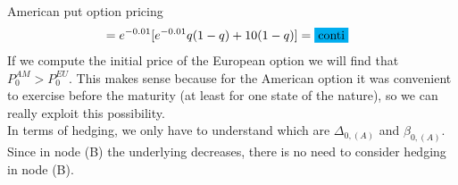 \begin{example}{American put option pricing}{}{}
\begin{align*}
        &= e^{-0.01}[e^{-0.01}q(1-q)+10(1-q)] = \colorbox{cyan}{conti}
    \end{align*}
    If we compute the initial price of the European option we will find that
    $P^{AM}_{0}>P^{EU}_{0}$. This makes sense because for the American option it was convenient to exercise before the maturity (at least for one state of the nature), so we can really exploit this possibility.\\
    In terms of hedging, we only have to understand which are $\Delta_{0,(A)}$ and $\beta_{0,(A)}$. Since in node (B) the underlying decreases, there is no need to consider hedging in node (B).
\end{example}


